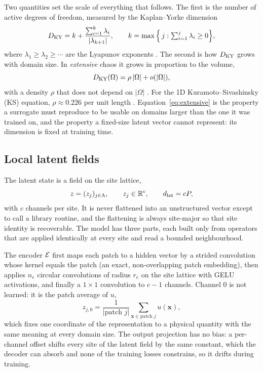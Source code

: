 Two quantities set the scale of everything that follows. The first is
the number of active degrees of freedom, measured by the Kaplan--Yorke
dimension
\begin{equation}
  D_{\mathrm{KY}} = k + \frac{\sum_{i=1}^{k}\lambda_i}{|\lambda_{k+1}|},
  \qquad
  k = \max\Big\{\, j : \textstyle\sum_{i=1}^{j}\lambda_i \ge 0 \Big\},
  \label{eq:dky}
\end{equation}
where $\lambda_1\ge\lambda_2\ge\cdots$ are the Lyapunov exponents
\citep{kaplanyorke1979}. The second is how $D_{\mathrm{KY}}$ grows with domain
size. In \emph{extensive} chaos it grows in proportion to the volume,
\begin{equation}
  D_{\mathrm{KY}}(\Omega) = \rho\,|\Omega| + o(|\Omega|),
  \label{eq:extensive}
\end{equation}
with a density $\rho$ that does not depend on $|\Omega|$
\citep{ruelle1982,manneville1985,egolfgreenside1994}. For the 1D
Kuramoto--Sivashinsky (KS) equation, $\rho\approx0.226$ per unit length
\citep{edson2019}. Equation~\eqref{eq:extensive} is the property a
surrogate must reproduce to be usable on domains larger than the one it
was trained on, and the property a fixed-size latent vector cannot
represent: its dimension is fixed at training time.

\subsection{Local latent fields}
\label{sec:local_field}

The latent state is a field on the site lattice,
\begin{equation}
  z = (z_j)_{j\in\Lambda}, \qquad z_j \in \mathbb{R}^{c},
  \qquad d_{\mathrm{lat}} = cP,
  \label{eq:latent_field}
\end{equation}
with $c$ channels per site. It is never flattened into an unstructured
vector except to call a library routine, and the flattening is always
site-major so that site identity is recoverable. The model has three
parts, each built only from operators that are applied identically at
every site and read a bounded neighbourhood.

The encoder $\mathcal{E}$ first maps each patch to a hidden vector by a strided
convolution whose kernel equals the patch (an exact, non-overlapping
patch embedding), then applies $n_e$ circular convolutions of radius
$r_e$ on the site lattice with GELU activations, and finally a
$1\times1$ convolution to $c-1$ channels. Channel $0$ is not learned: it
is the patch average of $u$,
\begin{equation}
  z_{j,0} = \frac{1}{|\text{patch } j|}\sum_{\bm{x}\in\text{patch } j} u(\bm{x}),
  \label{eq:anchor}
\end{equation}
which fixes one coordinate of the representation to a physical quantity
with the same meaning at every domain size. The output projection has
no bias: a per-channel offset shifts every site of the latent field by
the same constant, which the decoder can absorb and none of the training
losses constrains, so it drifts during training.

